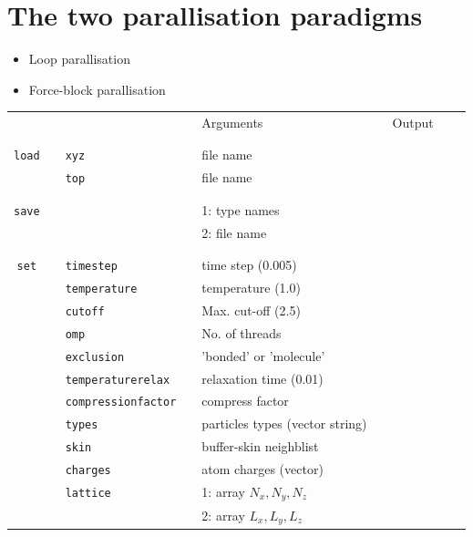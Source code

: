 \documentclass[11pt]{article}
\begin{document}
\section{The two parallisation paradigms}
\begin{itemize}
\item Loop parallisation
\item Force-block parallisation
\end{itemize}

\appendix

\clearpage
\begin{center}
  
  \begin{tabular}{cclclcccc}
    {\color{red}{\textbf{Action}}} && {\color{blue}{Specifier}} && Arguments && Output \\
                                   && && && \\
    \hline
                                   && && && \\
    \verb!load! && \verb!xyz! && file name && \\
    $\mbox{}$ && \verb!top! && file name && \\
                                   && && && \\
    \hline
    && && && \\
    \verb!save! &&  && 1: type names && \\
                &&  && 2: file name && \\
                                   && && && \\
    \hline
                                   && && && \\
    \verb!set! && \verb!timestep! && time step (0.005) && \\
    $\mbox{}$  && \verb!temperature! && temperature (1.0) && \\
    $\mbox{}$  && \verb!cutoff! && Max. cut-off (2.5) && \\
    $\mbox{}$  && \verb!omp! && No. of threads && \\
    $\mbox{}$ && \verb!exclusion! && 'bonded' or 'molecule' && \\
    $\mbox{}$ && \verb!temperaturerelax! && relaxation time (0.01) && \\
    $\mbox{}$ && \verb!compressionfactor! && compress factor && \\
    $\mbox{}$ && \verb!types! && particles types (vector string) && \\
    $\mbox{}$ && \verb!skin! && buffer-skin neighblist && \\
    $\mbox{}$ && \verb!charges! && atom charges (vector) && \\
    $\mbox{}$ && \verb!lattice! && 1: array $N_x , N_y , N_z$ && \\
    $\mbox{}$ && $\mbox{}$      && 2: array $L_x, L_y, L_z$ && \\
  \end{tabular}

\end{center}
\end{document}

